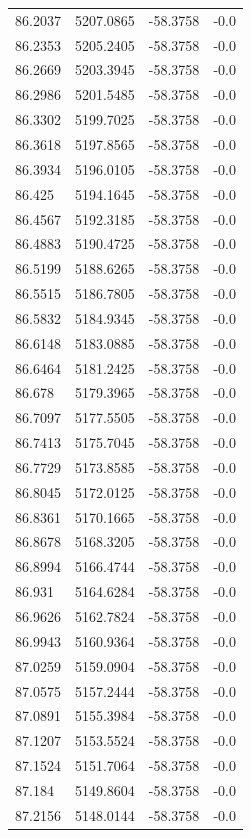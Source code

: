 \begin{table}[H]
\begin{tabular}{llll}
86.2037 & 5207.0865 & -58.3758 & -0.0 \\
86.2353 & 5205.2405 & -58.3758 & -0.0 \\
86.2669 & 5203.3945 & -58.3758 & -0.0 \\
86.2986 & 5201.5485 & -58.3758 & -0.0 \\
86.3302 & 5199.7025 & -58.3758 & -0.0 \\
86.3618 & 5197.8565 & -58.3758 & -0.0 \\
86.3934 & 5196.0105 & -58.3758 & -0.0 \\
86.425 & 5194.1645 & -58.3758 & -0.0 \\
86.4567 & 5192.3185 & -58.3758 & -0.0 \\
86.4883 & 5190.4725 & -58.3758 & -0.0 \\
86.5199 & 5188.6265 & -58.3758 & -0.0 \\
86.5515 & 5186.7805 & -58.3758 & -0.0 \\
86.5832 & 5184.9345 & -58.3758 & -0.0 \\
86.6148 & 5183.0885 & -58.3758 & -0.0 \\
86.6464 & 5181.2425 & -58.3758 & -0.0 \\
86.678 & 5179.3965 & -58.3758 & -0.0 \\
86.7097 & 5177.5505 & -58.3758 & -0.0 \\
86.7413 & 5175.7045 & -58.3758 & -0.0 \\
86.7729 & 5173.8585 & -58.3758 & -0.0 \\
86.8045 & 5172.0125 & -58.3758 & -0.0 \\
86.8361 & 5170.1665 & -58.3758 & -0.0 \\
86.8678 & 5168.3205 & -58.3758 & -0.0 \\
86.8994 & 5166.4744 & -58.3758 & -0.0 \\
86.931 & 5164.6284 & -58.3758 & -0.0 \\
86.9626 & 5162.7824 & -58.3758 & -0.0 \\
86.9943 & 5160.9364 & -58.3758 & -0.0 \\
87.0259 & 5159.0904 & -58.3758 & -0.0 \\
87.0575 & 5157.2444 & -58.3758 & -0.0 \\
87.0891 & 5155.3984 & -58.3758 & -0.0 \\
87.1207 & 5153.5524 & -58.3758 & -0.0 \\
87.1524 & 5151.7064 & -58.3758 & -0.0 \\
87.184 & 5149.8604 & -58.3758 & -0.0 \\
87.2156 & 5148.0144 & -58.3758 & -0.0 \\

\end{tabular}
\end{table}

